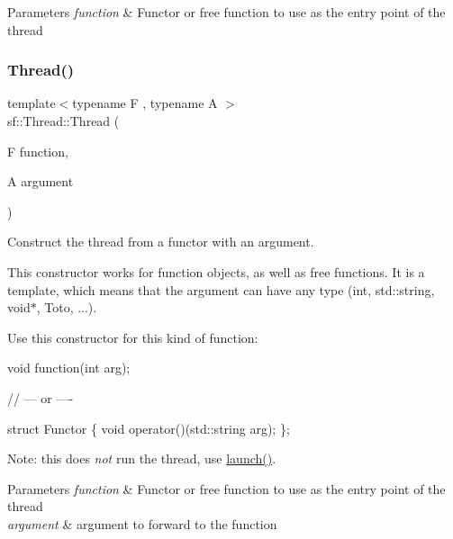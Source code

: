 \begin{DoxyParams}{Parameters}
{\em function} & Functor or free function to use as the entry point of the thread \\
\hline
\end{DoxyParams}
\mbox{\label{classsf_1_1_thread_a719b2cc067d92d52c35064a49d850a53}} 
\subsubsection{\texorpdfstring{Thread()}{Thread()}\hspace{0.1cm}{\footnotesize\ttfamily [2/3]}}
{\footnotesize\ttfamily template$<$typename F , typename A $>$ \\
sf\+::\+Thread\+::\+Thread (\begin{DoxyParamCaption}\item[{F}]{function,  }\item[{A}]{argument }\end{DoxyParamCaption})}



Construct the thread from a functor with an argument. 

This constructor works for function objects, as well as free functions. It is a template, which means that the argument can have any type (int, std\+::string, void$\ast$, Toto, ...).

Use this constructor for this kind of function\+: 
\begin{DoxyCode}
\textcolor{keywordtype}{void} \textcolor{keyword}{function}(\textcolor{keywordtype}{int} arg);

\textcolor{comment}{// --- or ----}

\textcolor{keyword}{struct }Functor
\{
    \textcolor{keywordtype}{void} operator()(std::string arg);
\};
\end{DoxyCode}
 Note\+: this does {\itshape not} run the thread, use \hyperlink{classsf_1_1_thread_a74f75a9e86e1eb47479496314048b5f6}{launch()}.


\begin{DoxyParams}{Parameters}
{\em function} & Functor or free function to use as the entry point of the thread \\
\hline
{\em argument} & argument to forward to the function \\
\hline
\end{DoxyParams}
\mbox{\label{classsf_1_1_thread_aa9f473c8cbb078900c62b1fd14a83a34}} 
